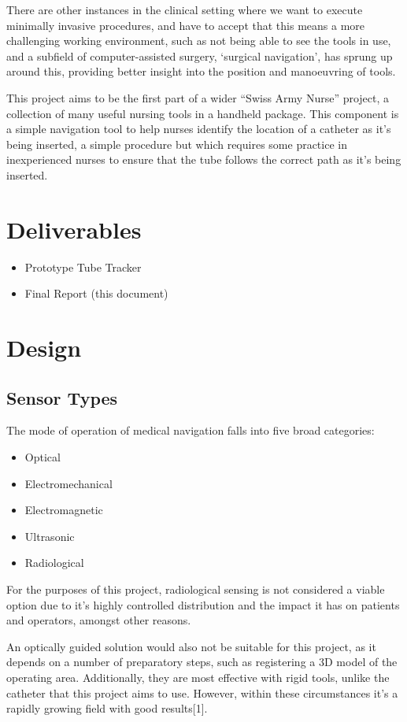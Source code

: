 \documentclass[a4paper]{article}
\begin{document}
    There are other instances in the clinical setting where we want to execute minimally invasive procedures, and have to accept that this means a more challenging working environment, such as not being able to see the tools in use, and a subfield of computer-assisted surgery, `surgical navigation', has sprung up around this, providing better insight into the position and manoeuvring of tools.

    This project aims to be the first part of a wider ``Swiss Army Nurse'' project, a collection of many useful nursing tools in a handheld package. This component is a simple navigation tool to help nurses identify the location of a catheter as it's being inserted, a simple procedure but which requires some practice in inexperienced nurses to ensure that the tube follows the correct path as it's being inserted.

    \section{Deliverables}
    \begin{itemize}
        \item Prototype Tube Tracker
        \item Final Report (this document)
    \end{itemize}

    \section{Design}
        \subsection{Sensor Types}
        The mode of operation of medical navigation falls into five broad categories:
        \begin{itemize}
            \item Optical
            \item Electromechanical
            \item Electromagnetic
            \item Ultrasonic
            \item Radiological
        \end{itemize}
        For the purposes of this project, radiological sensing is not considered a viable option due to it's highly controlled distribution and the impact it has on patients and operators, amongst other reasons.

        An optically guided solution would also not be suitable for this project, as it depends on a number of preparatory steps, such as registering a 3D model of the operating area. Additionally, they are most effective with rigid tools, unlike the catheter that this project aims to use. However, within these circumstances it's a rapidly growing field with good results[1].
\end{document}
